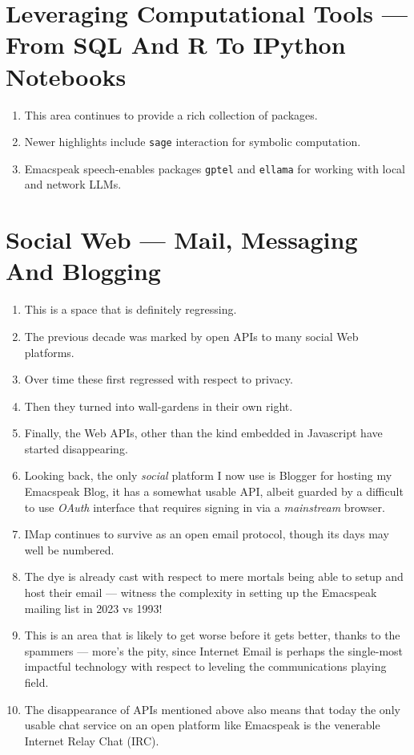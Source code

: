 \documentclass[11pt]{article}
\begin{document}
\section{Leveraging Computational Tools —  From SQL And R To IPython Notebooks}
\label{sec:org0353173}

\begin{enumerate}
\item This area continues to provide a rich collection of  packages.
\item Newer highlights include \texttt{sage} interaction for symbolic computation.
\item Emacspeak speech-enables  packages  \texttt{gptel} and \texttt{ellama} for working
with local and network LLMs.
\end{enumerate}
\section{Social Web  — Mail, Messaging And Blogging}
\label{sec:orgdc568b3}

\begin{enumerate}
\item This is a space that is definitely regressing.
\item The previous decade was marked by open APIs to many social Web platforms.
\item Over time these first regressed with respect to privacy.
\item Then they turned into wall-gardens in their own right.
\item Finally, the Web APIs, other than the kind embedded in Javascript have
started disappearing.
\item Looking back, the only \emph{social} platform I now use is Blogger for
hosting my Emacspeak Blog, it has a somewhat usable API, albeit
guarded by a difficult to use \emph{OAuth} interface that requires 
signing   in via  a \emph{mainstream} browser.
\item IMap continues to survive as an open email protocol, though its
days may well be numbered.
\item The dye is already cast with respect to mere mortals being able
to setup and  host their email ---  witness the complexity in setting
up the Emacspeak mailing list in 2023 vs 1993!
\item This is an area that is  likely to get worse before it gets
better,  thanks to the spammers  --- more's  the pity, since Internet Email is perhaps the
single-most impactful technology with respect to leveling the
communications playing field.
\item The disappearance of APIs mentioned above also means that today
the only usable chat service on an open platform like Emacspeak
is the venerable  Internet Relay Chat (IRC).
\end{enumerate}
\end{document}
